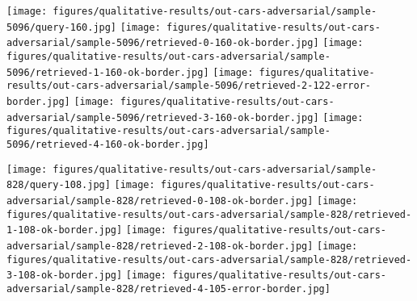 \documentclass[10pt,journal,compsoc]{IEEEtran}
\begin{document}
\begin{figure*}[htbp]
\begin{center}
    \vspace{0.2cm}
    \texttt{[image: figures/qualitative-results/out-cars-adversarial/sample-5096/query-160.jpg]}
    \texttt{[image: figures/qualitative-results/out-cars-adversarial/sample-5096/retrieved-0-160-ok-border.jpg]}
    \texttt{[image: figures/qualitative-results/out-cars-adversarial/sample-5096/retrieved-1-160-ok-border.jpg]}
    \texttt{[image: figures/qualitative-results/out-cars-adversarial/sample-5096/retrieved-2-122-error-border.jpg]}
    \texttt{[image: figures/qualitative-results/out-cars-adversarial/sample-5096/retrieved-3-160-ok-border.jpg]}
    \texttt{[image: figures/qualitative-results/out-cars-adversarial/sample-5096/retrieved-4-160-ok-border.jpg]}

    \vspace{0.2cm}
    \texttt{[image: figures/qualitative-results/out-cars-adversarial/sample-828/query-108.jpg]}
    \texttt{[image: figures/qualitative-results/out-cars-adversarial/sample-828/retrieved-0-108-ok-border.jpg]}
    \texttt{[image: figures/qualitative-results/out-cars-adversarial/sample-828/retrieved-1-108-ok-border.jpg]}
    \texttt{[image: figures/qualitative-results/out-cars-adversarial/sample-828/retrieved-2-108-ok-border.jpg]}
    \texttt{[image: figures/qualitative-results/out-cars-adversarial/sample-828/retrieved-3-108-ok-border.jpg]}
    \texttt{[image: figures/qualitative-results/out-cars-adversarial/sample-828/retrieved-4-105-error-border.jpg]}


\end{center}
\end{figure*}
\end{document}

